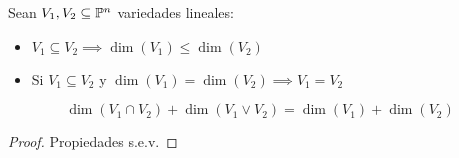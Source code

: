\begin{prop}
    Sean $V_1, V_2 \subseteq \mathbb{P}^n$ variedades lineales:
    \begin{itemize}
        \item $V_1 \subseteq V_2 \implies \dim \left( V_1\right) \leq \dim \left( V_2 \right)$
        \item Si $V_1 \subseteq V_2$ y $\dim \left( V_1 \right) = \dim \left( V_2 \right) \implies V_1 = V_2$
    \end{itemize}
\end{prop}
\begin{prop}
    \[ \dim \left( V_1 \cap V_2 \right) + \dim \left( V_1 \vee V_2 \right) = \dim \left( V_1 \right) + \dim \left( V_2 \right) \]
\end{prop}
\begin{proof}
    Propiedades s.e.v.
\end{proof}
